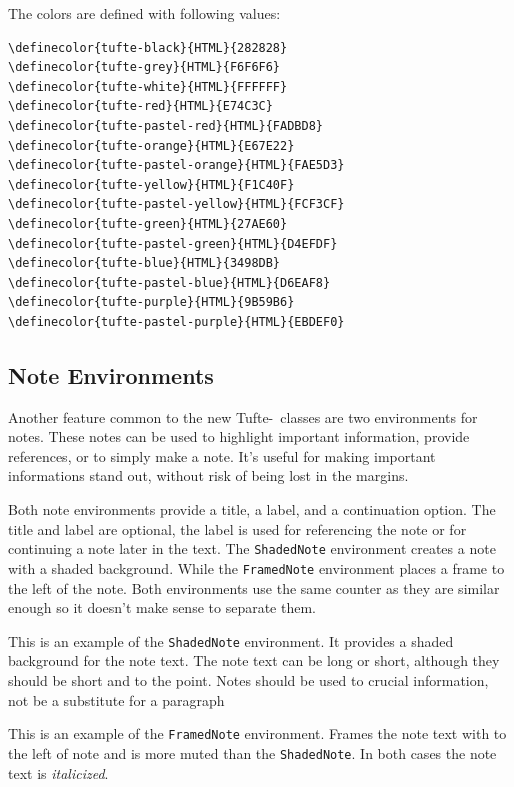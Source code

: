 \documentclass[a4paper]{tufte-handout}
\newcommand{\TL}{Tufte-\hologo{LaTeX}\xspace}
\newcommand{\hlorange}[1]{\textcolor{tufte-orange}{#1}}
\newcommand{\docenv}[1]{\hlorange{\texttt{#1}}}
\begin{document}
The colors are defined with following values:
\begin{Verbatim}
\definecolor{tufte-black}{HTML}{282828}
\definecolor{tufte-grey}{HTML}{F6F6F6}
\definecolor{tufte-white}{HTML}{FFFFFF}
\definecolor{tufte-red}{HTML}{E74C3C}
\definecolor{tufte-pastel-red}{HTML}{FADBD8}
\definecolor{tufte-orange}{HTML}{E67E22}
\definecolor{tufte-pastel-orange}{HTML}{FAE5D3}
\definecolor{tufte-yellow}{HTML}{F1C40F}
\definecolor{tufte-pastel-yellow}{HTML}{FCF3CF}
\definecolor{tufte-green}{HTML}{27AE60}
\definecolor{tufte-pastel-green}{HTML}{D4EFDF}
\definecolor{tufte-blue}{HTML}{3498DB}
\definecolor{tufte-pastel-blue}{HTML}{D6EAF8}
\definecolor{tufte-purple}{HTML}{9B59B6}
\definecolor{tufte-pastel-purple}{HTML}{EBDEF0}
\end{Verbatim}

\subsection{Note Environments}\label{ssec:note-environments}
Another feature common to the new \TL\ classes are two environments for notes.
These notes can be used to highlight important information, provide references, or to simply make a note.
It's useful for making important informations stand out, without risk of being lost in the margins.

Both note environments provide a title, a label, and a continuation option.
The title and label are optional, the label is used for referencing the note or for continuing a note later in the text.
The \docenv{ShadedNote} environment creates a note with a shaded background. 
While the \docenv{FramedNote} environment places a frame to the left of the note. 
Both environments use the same counter as they are similar enough so it doesn't make sense to separate them.

\begin{ShadedNote}
  This is an example of the \texttt{ShadedNote} environment.
  It provides a shaded background for the note text. 
  The note text can be long or short, although they should be short and to the point.
  Notes should be used to crucial information, not be a substitute for a paragraph
\end{ShadedNote}

\begin{FramedNote}[
  name={Note Title},
  label={fn:framed-note-example}
  ]
  This is an example of the \texttt{FramedNote} environment.
  Frames the note text with to the left of note and is more muted than the \texttt{ShadedNote}.
  In both cases the note text is \textit{italicized}.
\end{FramedNote}
\end{document}
